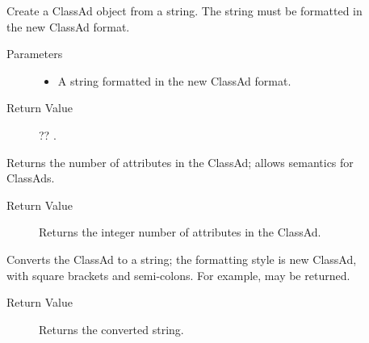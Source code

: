 \begin{description}

\item []
  Create a ClassAd object from a string.
  The string must be formatted in the new ClassAd format.

  \begin{description}
    \item[ Parameters]
    \begin{itemize}
      \item {} A string formatted in the new ClassAd format. 
    \end{itemize}
    \item[ Return Value]
      ?? .
  \end{description}  

\item []
  Returns the number of attributes in the ClassAd; 
  allows  semantics for ClassAds.

  \begin{description}
    \item[ Return Value]
      Returns the integer number of attributes in the ClassAd.
  \end{description}  

\item []
  Converts the ClassAd to a string; the formatting style is new ClassAd,
  with square brackets and semi-colons.  
  For example, \Expr{[ Foo = "bar"; ]} may be returned.

  \begin{description}
    \item[ Return Value]
      Returns the converted string.
  \end{description}  

\end{description}

